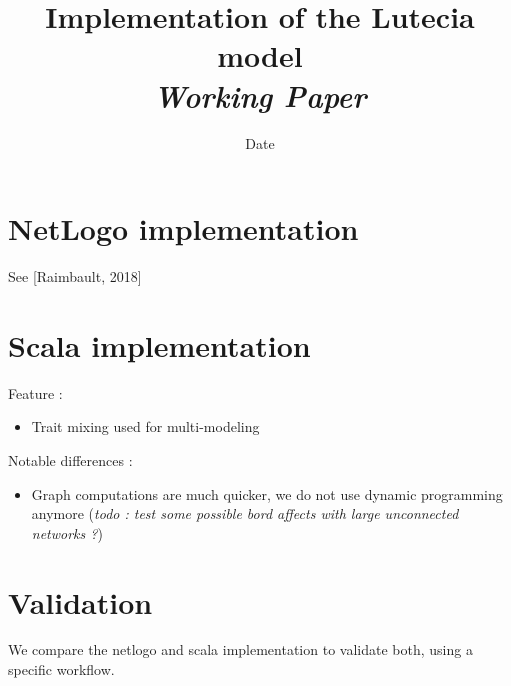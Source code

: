 


\title{Implementation of the Lutecia model\bigskip\\
\textit{Working Paper}
}
\author{}
\date{Date}


\maketitle

\justify


\begin{abstract}

\end{abstract}


\section*{NetLogo implementation}

See [Raimbault, 2018]



\section*{Scala implementation}

Feature :

\begin{itemize}
	\item Trait mixing used for multi-modeling
\end{itemize}


Notable differences :

\begin{itemize}
	\item Graph computations are much quicker, we do not use dynamic programming anymore (\textit{todo : test some possible bord affects with large unconnected networks ?})
\end{itemize}





\section*{Validation}

We compare the netlogo and scala implementation to validate both, using a specific workflow.




















